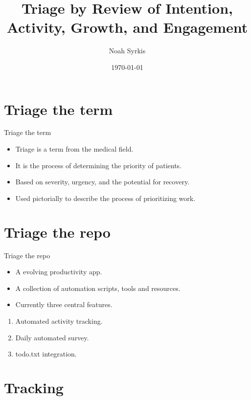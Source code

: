 \documentclass[aspectratio=32]{beamer}
\title{Triage by Review of Intention, Activity, Growth, and Engagement}
\date{\mydate\today}
\author{Noah Syrkis}
\providecommand{\tightlist}{\setlength{\itemsep}{0pt}\setlength{\parskip}{0pt}}
\begin{document}
  \begin{frame}[allowframebreaks]
    \titlepage
  \end{frame}

  \section{\textbar{} Triage the term}\label{triage-the-term}

  \begin{frame}[allowframebreaks]{\textbar{} Triage the term}
  \begin{itemize}
  \tightlist
  \item
    Triage is a term from the medical field.
  \item
    It is the process of determining the priority of patients.
  \item
    Based on severity, urgency, and the potential for recovery.
  \item
    Used pictorially to describe the process of prioritizing work.
  \end{itemize}
  \end{frame}

  \section{\textbar{} Triage the repo}\label{triage-the-repo}

  \begin{frame}[allowframebreaks]{\textbar{} Triage the repo}
  \begin{itemize}
  \tightlist
  \item
    A evolving productivity app.
  \item
    A collection of automation scripts, tools and resources.
  \item
    Currently three central features.
  \end{itemize}

  \framebreak

  \begin{enumerate}
  \tightlist
  \item
    Automated activity tracking.
  \item
    Daily automated survey.
  \item
    todo.txt integration.
  \end{enumerate}
  \end{frame}

  \section{\textbar{} Tracking}\label{tracking}
\end{document}
